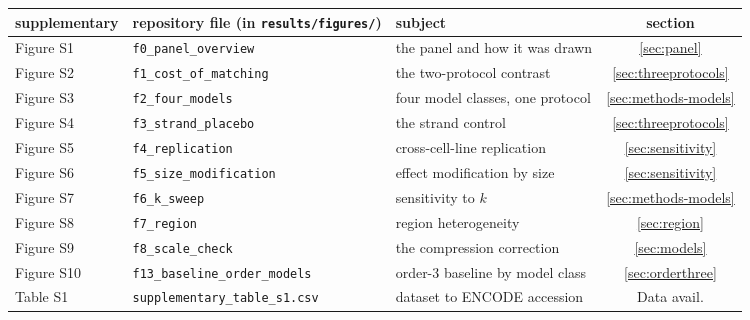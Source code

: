 \documentclass[11pt]{article}
\begin{document}
\begin{table}[ht]
\footnotesize
\centering
\begin{tabular}{lllc}
\toprule
supplementary & repository file (in \texttt{results/figures/}) & subject & section \\
\midrule
Figure S1  & \texttt{f0\_panel\_overview}          & the panel and how it was drawn   & \ref*{sec:panel} \\
Figure S2  & \texttt{f1\_cost\_of\_matching}       & the two-protocol contrast        & \ref*{sec:threeprotocols} \\
Figure S3  & \texttt{f2\_four\_models}             & four model classes, one protocol & \ref*{sec:methods-models} \\
Figure S4  & \texttt{f3\_strand\_placebo}          & the strand control               & \ref*{sec:threeprotocols} \\
Figure S5  & \texttt{f4\_replication}              & cross-cell-line replication      & \ref*{sec:sensitivity} \\
Figure S6  & \texttt{f5\_size\_modification}       & effect modification by size      & \ref*{sec:sensitivity} \\
Figure S7  & \texttt{f6\_k\_sweep}                 & sensitivity to $k$               & \ref*{sec:methods-models} \\
Figure S8  & \texttt{f7\_region}                   & region heterogeneity             & \ref*{sec:region} \\
Figure S9  & \texttt{f8\_scale\_check}             & the compression correction       & \ref*{sec:models} \\
Figure S10 & \texttt{f13\_baseline\_order\_models}  & order-3 baseline by model class  & \ref*{sec:orderthree} \\
Table S1   & \texttt{supplementary\_table\_s1.csv} & dataset to ENCODE accession      & Data avail. \\
\bottomrule
\end{tabular}
\end{table}

\clearpage
\end{document}
